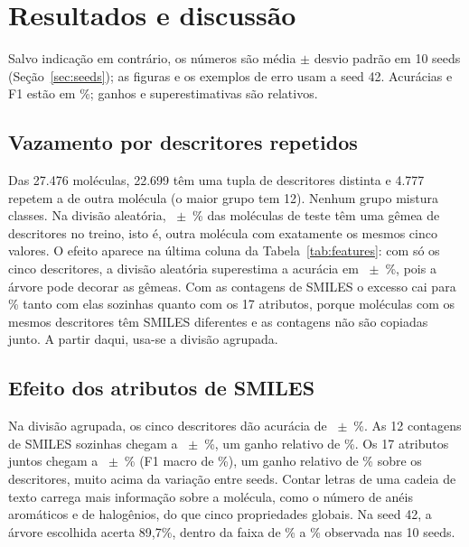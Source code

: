 \section{Resultados e discussão}

Salvo indicação em contrário, os números são média $\pm$ desvio padrão em 10 seeds (Seção~\ref{sec:seeds}); as figuras e os exemplos de erro usam a seed 42. Acurácias e F1 estão em \%; ganhos e superestimativas são relativos.

\subsection{Vazamento por descritores repetidos}\label{sec:vazamento}

Das 27.476 moléculas, 22.699 têm uma tupla de descritores distinta e 4.777 repetem a de outra molécula (o maior grupo tem 12). Nenhum grupo mistura classes. Na divisão aleatória, \gemeas~$\pm$~\sdGemeas\% das moléculas de teste têm uma gêmea de descritores no treino, isto é, outra molécula com exatamente os mesmos cinco valores. O efeito aparece na última coluna da Tabela~\ref{tab:features}: com só os cinco descritores, a divisão aleatória superestima a acurácia em \gapDesc~$\pm$~\sdGapDesc\%, pois a árvore pode decorar as gêmeas. Com as contagens de SMILES o excesso cai para \gapSmiles\% tanto com elas sozinhas quanto com os 17 atributos, porque moléculas com os mesmos descritores têm SMILES diferentes e as contagens não são copiadas junto. A partir daqui, usa-se a divisão agrupada.

\begin{table}[ht]
\centering
\caption{Árvore de decisão no teste, por conjunto de atributos (média $\pm$ desvio em 10 seeds). Cada linha reúne dois cenários da Tabela~\ref{tab:cenarios}. Superestimativa: quanto a acurácia da divisão aleatória excede a da agrupada, em termos relativos.}
\label{tab:features}
\footnotesize

\end{table}

\subsection{Efeito dos atributos de SMILES}

Na divisão agrupada, os cinco descritores dão acurácia de \accGrupDesc~$\pm$~\sdGrupDesc\%. As 12 contagens de SMILES sozinhas chegam a \accGrupSmiles~$\pm$~\sdGrupSmiles\%, um ganho relativo de \ganhoSmiles\%. Os 17 atributos juntos chegam a \accGrupAmbos~$\pm$~\sdGrupAmbos\% (F1 macro de \fscoreGrupAmbos\%), um ganho relativo de \ganhoAmbos\% sobre os descritores, muito acima da variação entre seeds. Contar letras de uma cadeia de texto carrega mais informação sobre a molécula, como o número de anéis aromáticos e de halogênios, do que cinco propriedades globais. Na seed 42, a árvore escolhida acerta 89,7\%, dentro da faixa de \faixaMin\% a \faixaMax\% observada nas 10 seeds.

